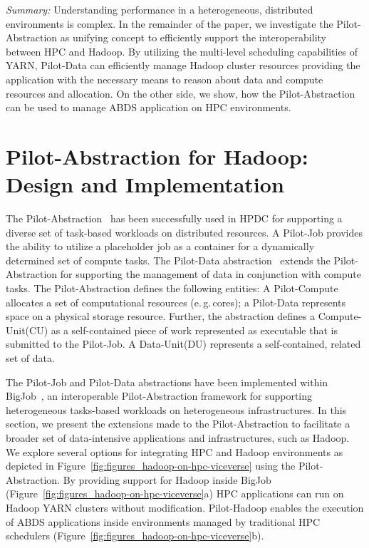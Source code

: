 \documentclass{sig-alternate}
\newcommand{\pilot}{Pilot\xspace}
\newcommand{\pilotjob}{Pilot-Job\xspace}
\newcommand{\pilotcompute}{Pilot-Compute\xspace}
\newcommand{\pilotdata}{Pilot-Data\xspace}
\newcommand{\computeunit}{Compute-Unit\xspace}
\newcommand{\dataunit}{Data-Unit\xspace}
\begin{document}
\emph{Summary:} Understanding performance in a heterogeneous, distributed
environments is complex. In the remainder of the paper, we investigate the
\pilot-Abstraction as unifying concept to efficiently support the
interoperability between HPC and Hadoop. By utilizing the multi-level
scheduling capabilities of YARN, \pilotdata can efficiently manage Hadoop
cluster resources providing the application with the necessary means to reason
about data and compute resources and allocation. On the other side, we show,
how the \pilot-Abstraction can be used to manage ABDS application on HPC
environments.





\section{Pilot-Abstraction for Hadoop: Design and Implementation}
\label{sec:pilot-data-hadoop}

The \pilot-Abstraction~\cite{pstar12} has been successfully used in HPDC for
supporting a diverse set of task-based workloads on distributed resources. A
\pilotjob provides the ability to utilize a
placeholder job as a container for a dynamically determined set of
compute tasks. The \pilotdata abstraction~\cite{pilotdata} extends the
\pilot-Abstraction for supporting the management of data in
conjunction with compute tasks. The \pilot-Abstraction defines the
following entities: A \pilotcompute allocates a set of computational
resources (e.\,g.\,cores); a \pilotdata represents space on a physical
storage resource. Further, the abstraction defines a \computeunit (CU)
as a self-contained piece of work represented as executable that is
submitted to the \pilotjob. A \dataunit (DU) represents a
self-contained, related set of data.


The \pilotjob and \pilotdata abstractions have been implemented within
BigJob~\cite{pstar12,saga_bigjob_condor_cloud}, an interoperable
\pilot-Abstraction framework for supporting heterogeneous tasks-based workloads
on heterogeneous infrastructures. In this section, we present the extensions
made to the \pilot-Abstraction to facilitate a broader set of data-intensive
applications and infrastructures, such as Hadoop. We explore several options
for integrating HPC and Hadoop environments as depicted in
Figure~\ref{fig:figures_hadoop-on-hpc-viceverse} using the \pilot-Abstraction.
By providing support for Hadoop inside BigJob
(Figure~\ref{fig:figures_hadoop-on-hpc-viceverse}a) HPC applications can run
on Hadoop YARN clusters without modification. \pilot-Hadoop enables the
execution of ABDS applications inside environments managed by traditional HPC
schedulers (Figure~\ref{fig:figures_hadoop-on-hpc-viceverse}b).
\end{document}
